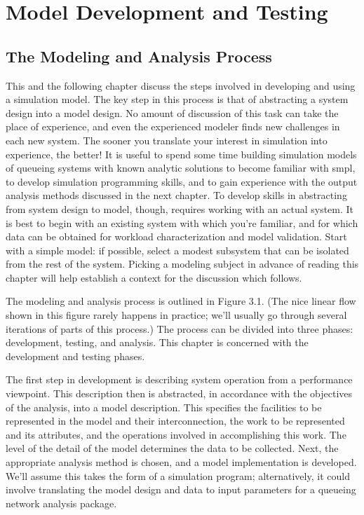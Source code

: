 \chapter{Model Development and Testing}
\label{chap:model-development-testing}

\section{The Modeling and Analysis Process}
\label{sec:modeling-analysis-process}

This and the following chapter discuss the steps involved in developing and
using a simulation model. The key step in this process is that of abstracting
 a system design into a model design. No amount of discussion of this task can
take the place of experience, and even the experienced modeler finds new
challenges in each new system. The sooner you translate your interest in
simulation into experience, the better! It is useful to spend some time
building simulation models of queueing systems with known analytic solutions
 to become familiar with smpl, to develop simulation programming skills, and
to gain experience with the output analysis methods discussed in the next
chapter. To develop skills in abstracting from system design to model,
though, requires working with an actual system. It is best to begin with an
existing system with which you're familiar, and for which data can be obtained
for workload characterization and model validation. Start with a simple model:
if possible, select a modest subsystem that can be isolated from the rest of
the system. Picking a modeling subject in advance of reading this chapter will
help establish a context for the discussion which follows.

The modeling and analysis process is outlined in Figure 3.1. (The nice linear
flow shown in this figure rarely happens in practice; we'll usually go through
several iterations of parts of this process.) The process can be divided into
three phases: development, testing, and analysis. This chapter is concerned
with the development and testing phases.

The first step in development is describing system operation from a
performance viewpoint. This description then is abstracted, in accordance
with the objectives of the analysis, into a model description. This specifies
the facilities to be represented in the model and their interconnection, the
work to be represented and its attributes, and the operations involved in
accomplishing this work. The level of the detail of the model determines the
data to be collected. Next, the appropriate analysis method is chosen, and a
model implementation is developed. We'll assume this takes the form of a
simulation program; alternatively, it could involve translating the model
design and data to input parameters for a queueing network analysis package.

